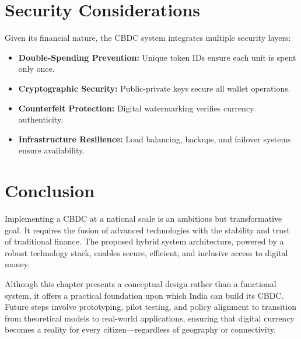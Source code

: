 \section{Security Considerations}
Given its financial nature, the CBDC system integrates multiple security layers:
\begin{itemize}
    \item \textbf{Double-Spending Prevention:} Unique token IDs ensure each unit is spent only once.
    \item \textbf{Cryptographic Security:} Public-private keys secure all wallet operations.
    \item \textbf{Counterfeit Protection:} Digital watermarking verifies currency authenticity.
    \item \textbf{Infrastructure Resilience:} Load balancing, backups, and failover systems ensure availability.
\end{itemize}

\section{Conclusion}
Implementing a CBDC at a national scale is an ambitious but transformative goal. It requires the fusion of advanced technologies with the stability and trust of traditional finance. The proposed hybrid system architecture, powered by a robust technology stack, enables secure, efficient, and inclusive access to digital money.

Although this chapter presents a conceptual design rather than a functional system, it offers a practical foundation upon which India can build its CBDC. Future steps involve prototyping, pilot testing, and policy alignment to transition from theoretical models to real-world applications, ensuring that digital currency becomes a reality for every citizen---regardless of geography or connectivity.
